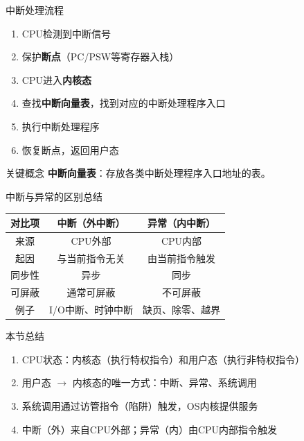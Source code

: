 \documentclass[10pt, aspectratio=169]{beamer}
\begin{document}
\begin{frame}{中断处理流程}
    \begin{enumerate}
        \item CPU检测到中断信号
        \item 保护\textbf{断点}（PC/PSW等寄存器入栈）
        \item CPU进入\textbf{内核态}
        \item 查找\textbf{中断向量表}，找到对应的中断处理程序入口
        \item 执行中断处理程序
        \item 恢复断点，返回用户态
    \end{enumerate}
    \vspace{0.5em}
    \begin{alertblock}{关键概念}
        \textbf{中断向量表}：存放各类中断处理程序入口地址的表。
    \end{alertblock}
\end{frame}

\begin{frame}{中断与异常的区别总结}
    \begin{tabular}{|c|c|c|}
        \hline
        对比项 & 中断（外中断） & 异常（内中断） \\
        \hline
        来源 & CPU外部 & CPU内部 \\
        起因 & 与当前指令无关 & 由当前指令触发 \\
        同步性 & 异步 & 同步 \\
        可屏蔽 & 通常可屏蔽 & 不可屏蔽 \\
        例子 & I/O中断、时钟中断 & 缺页、除零、越界 \\
        \hline
    \end{tabular}
\end{frame}

\begin{frame}{本节总结}
    \begin{enumerate}
        \item CPU状态：内核态（执行特权指令）和用户态（执行非特权指令）
        \item 用户态 $\to$ 内核态的唯一方式：中断、异常、系统调用
        \item 系统调用通过访管指令（陷阱）触发，OS内核提供服务
        \item 中断（外）来自CPU外部；异常（内）由CPU内部指令触发
    \end{enumerate}
\end{frame}
\end{document}
